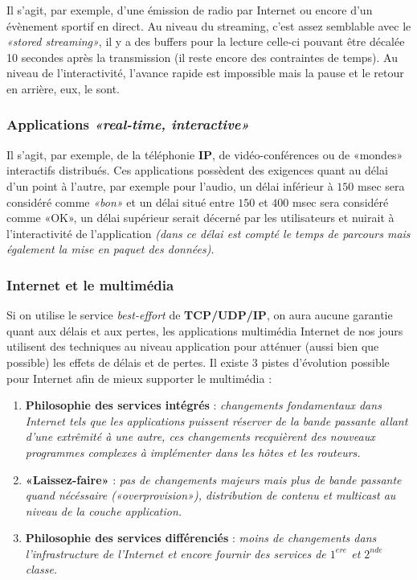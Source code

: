 \documentclass{article}
\newcommand{\bfp}[2]{\item \textbf{#1} : \textit{#2}}
\begin{document}
Il s'agit, par exemple, d'une émission de radio par Internet ou encore d'un évènement sportif en direct. Au 
niveau du streaming, c'est assez semblable avec le \textit{«stored streaming»}, il y a des buffers pour la 
lecture celle-ci pouvant être décalée 10 secondes après la transmission (il reste encore des contraintes de 
temps). Au niveau de l'interactivité, l'avance rapide est impossible mais la pause et le retour en arrière, eux, 
le sont.

\subsubsection{Applications \textit{«real-time, interactive»}}

Il s'agit, par exemple, de la téléphonie \textbf{IP}, de vidéo-conférences ou de «mondes» interactifs distribués. 
Ces applications possèdent des exigences quant au délai d'un point à l'autre, par exemple pour l'audio, un délai 
inférieur à $150$ msec sera considéré comme \textit{«bon»} et un délai situé entre $150$ et $400$ msec sera 
considéré comme «OK», un délai supérieur serait décerné par les utilisateurs et nuirait à l'interactivité de 
l'application \textit{(dans ce délai est compté le temps de parcours mais également la mise en paquet des 
données)}.

\subsubsection{Internet et le multimédia}

Si on utilise le service \textit{best-effort} de \textbf{TCP/UDP/IP}, on aura aucune garantie quant aux délais et 
aux pertes, les applications multimédia Internet de nos jours utilisent des techniques au niveau application pour 
atténuer (aussi bien que possible) les effets de délais et de pertes. Il existe 3 pistes d'évolution possible 
pour Internet afin de mieux supporter le multimédia :
\begin{enumerate}
\bfp{Philosophie des services intégrés}{changements fondamentaux dans Internet tels que les applications puissent
réserver de la bande passante allant d'une extrêmité à une autre, ces changements recquièrent des nouveaux 
programmes complexes à implémenter dans les hôtes et les routeurs.}
\bfp{«Laissez-faire»}{pas de changements majeurs mais plus de bande passante quand nécéssaire 
\textit{(«overprovision»)}, distribution de contenu et multicast au niveau de la couche application.}
\bfp{Philosophie des services différenciés}{moins de changements dans l'infrastructure de l'Internet et encore 
fournir des services de $1^{ere}$ et $2^{nde}$ classe.}
\end{enumerate}
\end{document}
